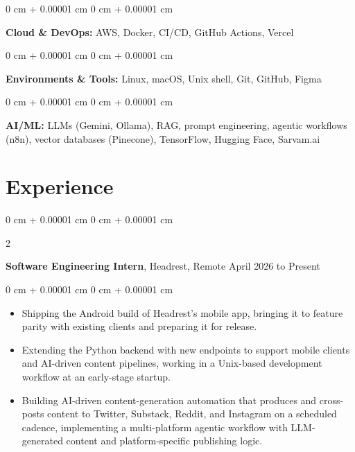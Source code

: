 \documentclass[10pt, letterpaper]{article}
\newenvironment{highlights}{
    \begin{itemize}[
        topsep=0.10 cm,
        parsep=0.10 cm,
        partopsep=0pt,
        itemsep=0pt,
        leftmargin=0 cm + 10pt
    ]
}{
    \end{itemize}
} %
\newenvironment{onecolentry}{
    \begin{adjustwidth}{
        0 cm + 0.00001 cm
    }{
        0 cm + 0.00001 cm
    }
}{
    \end{adjustwidth}
} %
\newenvironment{twocolentry}[2][]{
    \onecolentry
    \def\secondColumn{#2}
    \setcolumnwidth{\fill, 4.5 cm}
    \begin{paracol}{2}
}{
    \switchcolumn \raggedleft \secondColumn
    \end{paracol}
    \endonecolentry
} %
\begin{document}
        \vspace{0.2 cm}

        \begin{onecolentry}
            \textbf{Cloud \& DevOps:} AWS, Docker, CI/CD, GitHub Actions, Vercel
        \end{onecolentry}

        \vspace{0.2 cm}

        \begin{onecolentry}
            \textbf{Environments \& Tools:} Linux, macOS, Unix shell, Git, GitHub, Figma
        \end{onecolentry}

        \vspace{0.2 cm}

        \begin{onecolentry}
            \textbf{AI/ML:} LLMs (Gemini, Ollama), RAG, prompt engineering, agentic workflows (n8n), vector databases (Pinecone), TensorFlow, Hugging Face, Sarvam.ai
        \end{onecolentry}


    \section{Experience}

        \begin{twocolentry}{
            April 2026 to Present
        }
            \textbf{Software Engineering Intern}, Headrest, Remote\end{twocolentry}

        \vspace{0.10 cm}
        \begin{onecolentry}
            \begin{highlights}
                \item Shipping the Android build of Headrest's mobile app, bringing it to feature parity with existing clients and preparing it for release.
                \item Extending the Python backend with new endpoints to support mobile clients and AI-driven content pipelines, working in a Unix-based development workflow at an early-stage startup.
                \item Building AI-driven content-generation automation that produces and cross-posts content to Twitter, Substack, Reddit, and Instagram on a scheduled cadence, implementing a multi-platform agentic workflow with LLM-generated content and platform-specific publishing logic.
            \end{highlights}
        \end{onecolentry}
\end{document}
